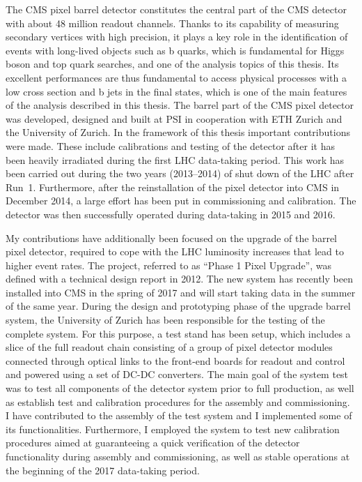 The CMS pixel barrel detector constitutes the central part of the CMS detector with about 48 million readout channels. Thanks to its capability of measuring secondary vertices with high precision,
it plays a key role in the identification of events with long-lived objects such as b quarks, which is fundamental for Higgs boson and top quark searches, and one of the analysis topics of this thesis.
Its excellent performances are thus fundamental to access physical processes with a low cross section and b jets in the final states, which is one of the main features of the analysis described in this thesis.
The barrel part of the CMS pixel detector was developed, designed and built at PSI in cooperation with ETH Zurich and the University of Zurich.
In the framework of this thesis important contributions were made. These include calibrations and testing of the detector after it has been heavily irradiated during the first LHC data-taking period.
This work has been carried out during the two years (2013--2014) of shut down of the LHC after Run~1. Furthermore, after the reinstallation of the pixel detector into CMS in December 2014,
a large effort has been put in commissioning and calibration. The detector was then successfully operated during data-taking in 2015 and 2016.

My contributions have additionally been focused on the upgrade of the barrel pixel detector, required to cope with the LHC luminosity increases that lead to higher event rates.
The project, referred to as ``Phase 1 Pixel Upgrade'', was defined with a technical design report in 2012. The new system has recently been installed into CMS in the spring of 2017
and will start taking data in the summer of the same year.
During the design and prototyping phase of the upgrade barrel system, the University of Zurich has been responsible for the testing of the complete system.
For this purpose, a test stand has been setup, which includes a slice of the full readout chain consisting of a group of pixel detector modules connected through optical links to the front-end boards for readout and control and powered using a set of DC-DC converters. The main goal of the system test was to test all components of the detector system prior to full production, as well as establish test and calibration procedures for the assembly and commissioning. I have contributed to the assembly of the test system and I implemented some of its functionalities. Furthermore, I employed the system to test new calibration procedures
aimed at guaranteeing a quick verification of the detector functionality during assembly and commissioning, as well as stable operations at the beginning of the 2017 data-taking period.\\

